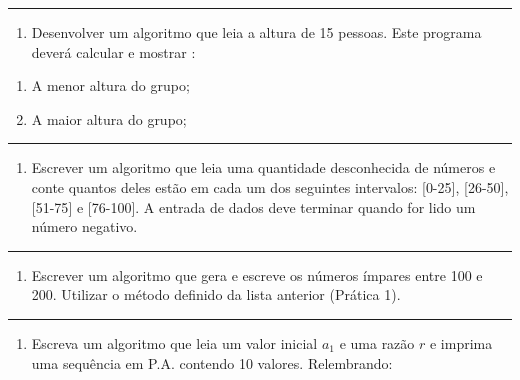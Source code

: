 \documentclass[12pt,a4paper]{article}
\providecommand{\tightlist}{%
      \setlength{\itemsep}{0pt}\setlength{\parskip}{0pt}}
\begin{document}
    \begin{center}\rule{0.5\linewidth}{0.5pt}\end{center}

\begin{enumerate}
\def\labelenumi{\arabic{enumi}.}
\tightlist
\item
  Desenvolver um algoritmo que leia a altura de 15 pessoas. Este
  programa deverá calcular e mostrar :
\end{enumerate}

\begin{enumerate}
\def\labelenumi{\alph{enumi}.}
\item
  A menor altura do grupo;
\item
  A maior altura do grupo;
\end{enumerate}

    \begin{center}\rule{0.5\linewidth}{0.5pt}\end{center}

\begin{enumerate}
\def\labelenumi{\arabic{enumi}.}
\setcounter{enumi}{1}
\tightlist
\item
  Escrever um algoritmo que leia uma quantidade desconhecida de números
  e conte quantos deles estão em cada um dos seguintes intervalos:
  {[}0-25{]}, {[}26-50{]}, {[}51-75{]} e {[}76-100{]}. A entrada de
  dados deve terminar quando for lido um número negativo.
\end{enumerate}

    \begin{center}\rule{0.5\linewidth}{0.5pt}\end{center}

\begin{enumerate}
\def\labelenumi{\arabic{enumi}.}
\setcounter{enumi}{2}
\tightlist
\item
  Escrever um algoritmo que gera e escreve os números ímpares entre 100
  e 200. Utilizar o método definido da lista anterior (Prática 1).
\end{enumerate}

    \begin{center}\rule{0.5\linewidth}{0.5pt}\end{center}

\begin{enumerate}
\def\labelenumi{\arabic{enumi}.}
\setcounter{enumi}{3}
\tightlist
\item
  Escreva um algoritmo que leia um valor inicial \(a_1\) e uma razão
  \(r\) e imprima uma sequência em P.A. contendo 10 valores.
  Relembrando:
\end{enumerate}
\end{document}
